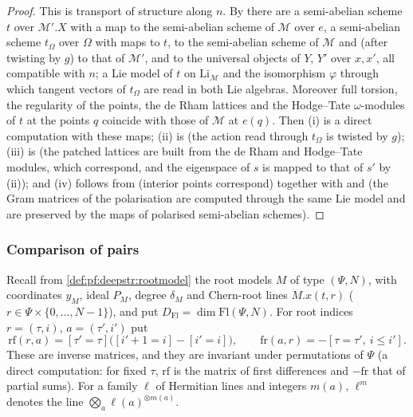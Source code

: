 \begin{proof}
This is transport of structure along $n$. By  there are a
semi-abelian scheme $t$ over $\mathcal M'.X$ with a map to the semi-abelian scheme of $\mathcal M$ over $e$, a semi-abelian
scheme $t_\Omega$ over $\Omega$ with maps to $t$, to the semi-abelian scheme of $\mathcal M$ and (after twisting by $g$) to that
of $\mathcal M'$, and to the universal objects of $Y$, $Y'$ over $x,x'$, all compatible with $n$; a Lie model of $t$ on
$\mathrm{Li}_{\mathcal M}$ and the isomorphism $\varphi$ through which tangent vectors of $t_\Omega$ are read in both Lie
algebras. Moreover full torsion, the regularity of the points, the de Rham lattices and the Hodge--Tate $\omega$-modules of
$t$ at the points $q$ coincide with those of $\mathcal M$ at $e(q)$. Then (i) is a direct computation with these maps;
(ii) is  (the action read through $t_\Omega$ is twisted by $g$);
(iii) is  (the patched lattices are built from the de Rham and
Hodge--Tate modules, which correspond, and the eigenspace of $s$ is mapped to that of $s'$ by (ii)); and (iv) follows from
 (interior points correspond) together with
 and 
(the Gram matrices of the polarisation are computed through the same Lie model and are preserved by the maps of polarised
semi-abelian schemes).
\end{proof}

\subsubsection*{Comparison of pairs}
Recall from \cref{def:pf:deepstr:rootmodel} the root models $M$ of type $(\Psi,N)$, with coordinates $y_M$, ideal $P_M$, degree
$\delta_M$ and Chern-root lines $M.x(t,r)$ ($r\in\Psi\times\{0,\dots,N-1\}$), and put $D_{\mathrm{Fl}}=\dim\mathrm{Fl}(\Psi,N)$. For
root indices $r=(\tau,i)$, $a=(\tau',i')$ put
\[
\mathrm{rf}(r,a)=[\tau'=\tau]\bigl([i'+1=i]-[i'=i]\bigr),\qquad\mathrm{fr}(a,r)=-[\tau=\tau',\ i\le i'].
\]
These are inverse matrices, and they are invariant under permutations of $\Psi$ (a direct computation: for fixed $\tau$,
$\mathrm{rf}$ is the matrix of first differences and $-\mathrm{fr}$ that of partial sums). For a family $\ell$ of Hermitian lines and
integers $m(a)$, $\ell^m$ denotes the line $\bigotimes_a\ell(a)^{\otimes m(a)}$.

